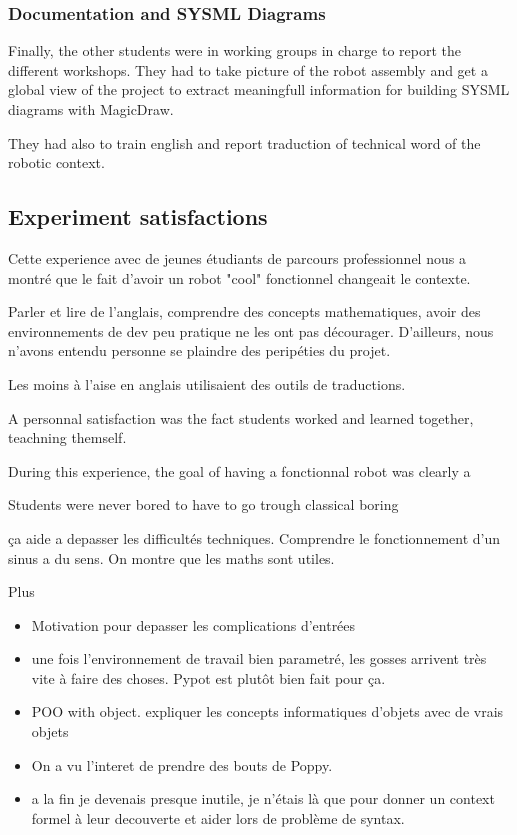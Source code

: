 \subsubsection{Documentation and SYSML Diagrams} %

Finally, the other students were in working groups in charge to report the different workshops. They had to take picture of the robot assembly and get a global view of the project to extract meaningfull information for building SYSML diagrams with MagicDraw.

They had also to train english and report traduction of technical word of the robotic context.


\subsection{Experiment satisfactions} %

Cette experience avec de jeunes étudiants de parcours professionnel nous a montré que le fait d'avoir un robot "cool" fonctionnel changeait le contexte.

Parler et lire de l'anglais, comprendre des concepts mathematiques, avoir des environnements de dev peu pratique ne les ont pas décourager. D'ailleurs, nous n'avons entendu personne se plaindre des peripéties du projet.

Les moins à l'aise en anglais utilisaient des outils de traductions.




A personnal satisfaction was the fact students worked and learned together, teachning themself.



During this experience, the goal of having a fonctionnal robot was clearly a

Students were never bored to have to go trough classical boring

ça aide a depasser les difficultés techniques. Comprendre le fonctionnement d'un sinus a du sens. On montre que les maths sont utiles.


Plus
\begin{itemize}
    \item Motivation pour depasser les complications d'entrées
    \item une fois l'environnement de travail bien parametré, les gosses arrivent très vite à faire des choses. Pypot est plutôt bien fait pour ça.
    \item POO with object. expliquer les concepts informatiques d'objets avec de vrais objets
    \item On a vu l'interet de prendre des bouts de Poppy.
    \item a la fin je devenais presque inutile, je n'étais là que pour donner un context formel à leur decouverte et aider lors de problème de syntax.
\end{itemize}



